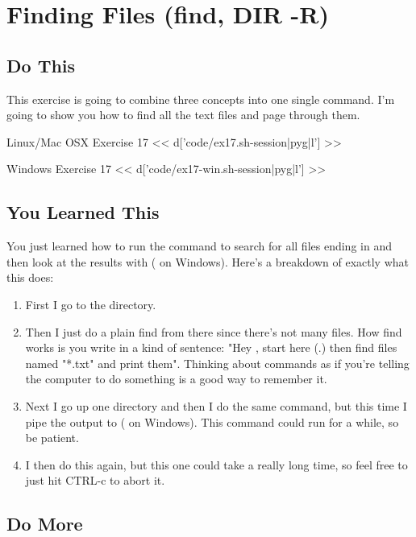 \chapter{Finding Files (find, DIR -R)}

\section{Do This}

This exercise is going to combine three concepts into one single command.  I'm
going to show you how to find all the text files and page through them.

\begin{code}{Linux/Mac OSX Exercise 17}
<< d['code/ex17.sh-session|pyg|l'] >>
\end{code}

\begin{code}{Windows Exercise 17}
<< d['code/ex17-win.sh-session|pyg|l'] >>
\end{code}

\section{You Learned This}

You just learned how to run the  command to search for all files
ending in  and then look at the results with  ( on Windows).  Here's a breakdown of exactly what this does:

\begin{enumerate}
\item First I go to the  directory.
\item Then I just do a plain find from there since there's not many 
files.  How find works is you write in a kind of sentence: "Hey ,
    start here (.) then find files named "*.txt" and print them".  Thinking
    about commands as if you're telling the computer to do something is a good
    way to remember it.
\item Next I go up one directory and then I do the same command, but this time I pipe the output to  ( on Windows).  This command could run for a while, so be patient.
\item I then do this again, but this one could take a really long time, so feel free to just hit CTRL-c to abort it.
\end{enumerate}


\section{Do More}


